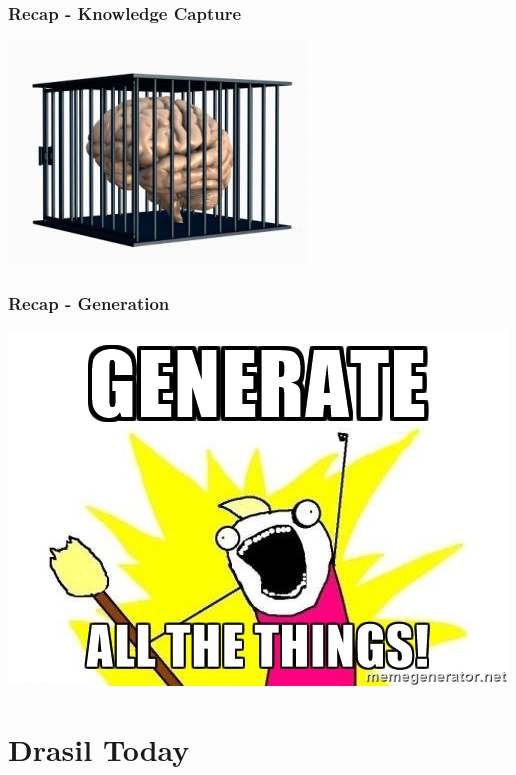 \documentclass{beamer}
\begin{document}
\begin{frame}

\frametitle{Recap - Knowledge Capture}
\begin{center}
\includegraphics[width=.6\textwidth]{KC.jpg}
\end{center}

\end{frame}


\begin{frame}

\frametitle{Recap - Generation}
\begin{center}
\includegraphics[width=.6\textwidth]{generate_all_the_things.jpg}
\end{center}

\end{frame}


\section[Drasil]{Drasil Today}

\end{document}
